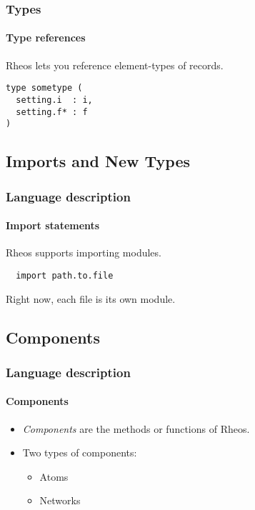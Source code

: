 \begin{frame}[fragile]
\frametitle{Types}
\framesubtitle{Type references}

Rheos lets you reference element-types of records.

\pause
\begin{example}
\begin{verbatim}
type sometype (
  setting.i  : i,
  setting.f* : f
)
\end{verbatim}
\end{example}

\end{frame}


\subsection*{Imports and New Types}
\begin{frame}[fragile]
\frametitle{Language description}
\framesubtitle{Import statements}

Rheos supports importing modules.

\pause
\begin{example}
\begin{verbatim}
  import path.to.file
\end{verbatim}
\end{example}

\pause
Right now, each file is its own module.

\end{frame}

\subsection*{Components}
\begin{frame}
\frametitle{Language description}
\framesubtitle{Components}

\begin{itemize}\pause
\item \emph{Components} are the methods or functions of Rheos.\pause

\item Two types of components:\pause
  \begin{itemize}
  \item Atoms\pause
  \item Networks
  \end{itemize}
\end{itemize}
\end{frame}



